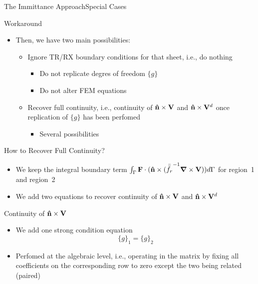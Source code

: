 \begin{frame}[allowframebreaks]{The Immittance Approach}{Special Cases}
\begin{block}{%
      Workaround}
\begin{itemize}
    \item Then, we have two main possibilities:
      \begin{itemize}
      \item \alert{Ignore}  TR/RX boundary conditions for that sheet, i.e., do nothing  
        \begin{itemize}
        \item Do not replicate  degres of freedom $\lbrace g\rbrace$
        \item Do not alter FEM equations
        \end{itemize}
      \item \alert{Recover} full continuity, i.e., continuity of
        $\mathbf{\hat{n}}\times\mathbf{V}$ and $\mathbf{\hat{n}}\times\mathbf{V}^d$ once replication of
        $\lbrace g\rbrace$ has been perfomed
        \begin{itemize}
        \item Several possibilities
        \end{itemize}
      \end{itemize}

    \end{itemize}
  \end{block}
      
  \framebreak  %

  \begin{center}
    How to Recover Full Continuity?
  \end{center}

  \begin{itemize}
  \item We keep  the integral boundary term $\int_{\Gamma} \mathbf{F}\cdot(\mathbf{\hat{n}} \times ( {\bar{\bar{f_r}}}^{-1} \boldsymbol{\nabla} \times \mathbf{V} )) d\Gamma$
    for region~1 and region~2

  \item We add two equations to recover continuity of
    $\mathbf{\hat{n}}\times\mathbf{V}$ and $\mathbf{\hat{n}}\times\mathbf{V}^d$
    \end{itemize}
    
  \begin{block}{Continuity of  $\mathbf{\hat{n}}\times\mathbf{V}$}
    \begin{itemize}
    \item We add one strong condition equation
      \begin{equation*}
         \lbrace g\rbrace_1 =  \lbrace g\rbrace_2 
      \end{equation*}

    \item Perfomed at the algebraic level, 
      i.e., operating in the matrix by fixing all coefficients on the
      corresponding row to zero except the two being related (paired)


\end{itemize}
\end{block}
\end{frame}
